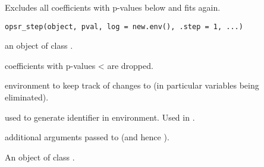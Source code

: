 %
\begin{Description}
Excludes all coefficients with p-values below  and fits again.
\end{Description}
%
\begin{Usage}
\begin{verbatim}
opsr_step(object, pval, log = new.env(), .step = 1, ...)
\end{verbatim}
\end{Usage}
%
\begin{Arguments}
\begin{ldescription}
\item[\code{object}] an object of class .

\item[\code{pval}] coefficients with p-values <  are dropped.

\item[\code{log}] environment to keep track of changes to  (in particular
variables being eliminated).

\item[\code{.step}] used to generate identifier in  environment. Used in
.

\item[\code{...}] additional arguments passed to  (and hence ).
\end{ldescription}
\end{Arguments}
%
\begin{Value}
An object of class .
\end{Value}
%
\begin{SeeAlso}
\end{SeeAlso}
%
\begin{Examples}
\end{Examples}


